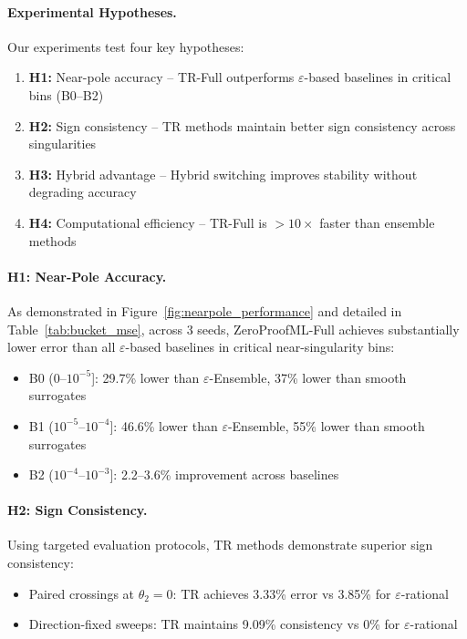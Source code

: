 \documentclass[twoside,11pt]{article}
\begin{document}
\paragraph{Experimental Hypotheses.}
Our experiments test four key hypotheses:
\begin{enumerate}
\item \textbf{H1:} Near-pole accuracy -- TR-Full outperforms $\varepsilon$-based baselines in critical bins (B0--B2)
\item \textbf{H2:} Sign consistency -- TR methods maintain better sign consistency across singularities
\item \textbf{H3:} Hybrid advantage -- Hybrid switching improves stability without degrading accuracy
\item \textbf{H4:} Computational efficiency -- TR-Full is $>10\times$ faster than ensemble methods
\end{enumerate}

\paragraph{H1: Near-Pole Accuracy.}
As demonstrated in Figure~\ref{fig:nearpole_performance} and detailed in Table~\ref{tab:bucket_mse}, across 3 seeds, ZeroProofML-Full achieves substantially lower error than all $\varepsilon$-based baselines in critical near-singularity bins:
\begin{itemize}
\item B0 (0--$10^{-5}$]: 29.7\% lower than $\varepsilon$-Ensemble, 37\% lower than smooth surrogates
\item B1 ($10^{-5}$--$10^{-4}$]: 46.6\% lower than $\varepsilon$-Ensemble, 55\% lower than smooth surrogates  
\item B2 ($10^{-4}$--$10^{-3}$]: 2.2--3.6\% improvement across baselines
\end{itemize}

\paragraph{H2: Sign Consistency.}
Using targeted evaluation protocols, TR methods demonstrate superior sign consistency:
\begin{itemize}
\item Paired crossings at $\theta_2=0$: TR achieves 3.33\% error vs 3.85\% for $\varepsilon$-rational
\item Direction-fixed sweeps: TR maintains 9.09\% consistency vs 0\% for $\varepsilon$-rational
\end{itemize}
\end{document}
